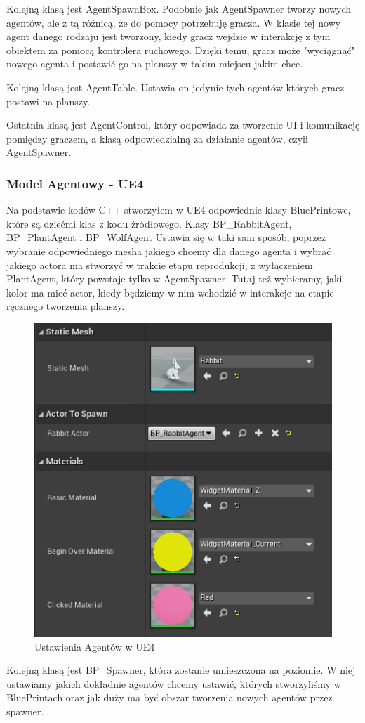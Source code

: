 \documentclass[a4paper,12pt,reqno]{article}
\begin{document}
Kolejną klasą jest AgentSpawnBox. Podobnie jak AgentSpawner tworzy nowych agentów, ale z tą róźnicą, że do pomocy potrzebuję gracza. W klasie tej nowy agent danego rodzaju jest tworzony, kiedy gracz wejdzie w interakcję z tym obiektem za pomocą kontrolera ruchowego. Dzięki temu, gracz może "wyciągnąć" nowego agenta i postawić go na planszy w takim miejscu jakim chce. 

Kolejną klasą jest AgentTable. Ustawia on jedynie tych agentów których gracz postawi na planszy.

Ostatnia klasą jest AgentControl, który odpowiada za tworzenie UI i komunikację pomiędzy graczem, a klasą odpowiedzialną za działanie agentów, czyli AgentSpawner. 

\subsubsection{Model Agentowy - UE4}

Na podstawie kodów C++ stworzyłem w UE4 odpowiednie klasy BluePrintowe, które są dziećmi klas z kodu źródłowego. Klasy BP\_RabbitAgent, BP\_PlantAgent i BP\_WolfAgent
Ustawia się w taki sam sposób, poprzez wybranie odpowiedniego mesha jakiego chcemy dla danego agenta i wybrać jakiego actora ma stworzyć w trakcie etapu reprodukcji, z wyłączeniem PlantAgent, który powstaje tylko w AgentSpawner. Tutaj też wybieramy, jaki kolor ma mieć actor, kiedy będziemy w nim wchodzić w interakcje na etapie ręcznego tworzenia planszy.

\begin{figure}[H]%
\centering
\includegraphics[width=0.4\columnwidth]{graphics//agent/BP_AgentActor.png}
\caption{Ustawienia Agentów w UE4 
\label{BPExample}}%
%
\qquad
\end{figure} 


Kolejną klasą jest BP\_Spawner, która zostanie umieszczona na poziomie. W niej ustawiamy jakich dokładnie agentów chcemy ustawić, których stworzyliśmy w BluePrintach oraz jak duży ma być obszar tworzenia nowych agentów przez spawner.
\end{document}
